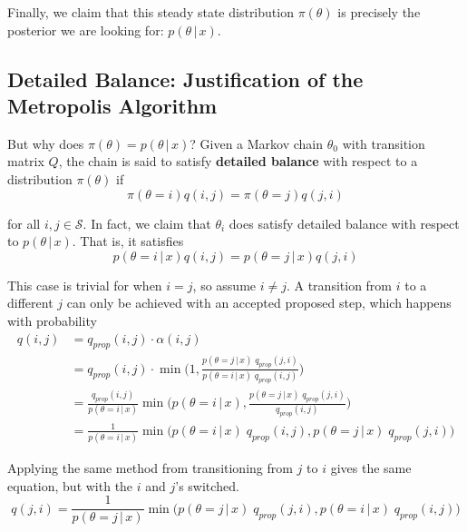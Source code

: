 \documentclass{article}
\begin{document}
  Finally, we claim that this steady state distribution $\pi(\theta)$ is precisely the posterior we are looking for: $p(\theta\,|\,x)$.

\subsection{Detailed Balance: Justification of the Metropolis Algorithm}

  But why does $\pi(\theta) = p(\theta\,|\,x)$? Given a Markov chain $\theta_0$ with transition matrix $Q$, the chain is said to satisfy \textbf{detailed balance} with respect to a distribution $\pi(\theta)$ if
  \begin{equation}
    \pi(\theta = i) q(i, j) = \pi(\theta = j) q(j, i)
  \end{equation}

  for all $i, j \in \mathcal{S}$. In fact, we claim that $\theta_i$ does satisfy detailed balance with respect to $p(\theta\,|\,x)$. That is, it satisfies
  \begin{equation}
    p(\theta = i\,|\,x) q(i, j) = p(\theta = j\,|\,x) q(j, i)
  \end{equation}

  This case is trivial for when $i=j$, so assume $i \neq j$. A transition from $i$ to a different $j$ can only be achieved with an accepted proposed step, which happens with probability
  \begin{align*}
    q(i, j) & = q_{prop} (i, j) \cdot \alpha(i, j) \\
    & = q_{prop} (i, j) \cdot \min\bigg( 1, \frac{p(\theta = j\,|\,x)\; q_{prop} (j, i)}{p(\theta = i\,|\,x) \; q_{prop}(i, j)}\bigg) \\
    & = \frac{q_{prop} (i, j)}{p(\theta = i\,|\,x)} \min\big( p(\theta = i\,|\,x), \frac{p(\theta = j\,|\,x)\; q_{prop} (j, i)}{q_{prop}(i, j)} \big) \\
    & = \frac{1}{p(\theta = i\,|\,x)} \min \big( p(\theta = i\,|\,x)\; q_{prop} (i, j), p(\theta = j\,|\,x) \; q_{prop} (j, i) \big)
  \end{align*}

  Applying the same method from transitioning from $j$ to $i$ gives the same equation, but with the $i$ and $j$'s switched.
  \begin{equation}
    q(j, i) = \frac{1}{p(\theta = j\,|\,x)} \min \big( p(\theta = j\,|\,x)\; q_{prop} (j, i), p(\theta = i\,|\,x) \; q_{prop} (i, j) \big)
  \end{equation}
\end{document}
